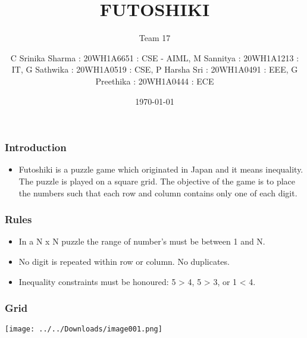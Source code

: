 \documentclass[14pt]{beamer}
\title{FUTOSHIKI}
\subtitle{Team 17}
\date{\today}
\author[14pt]{C Srinika Sharma : 20WH1A6651 : CSE - AIML, M Sannitya : 20WH1A1213 : IT, G Sathwika : 20WH1A0519 : CSE, P Harsha Sri : 20WH1A0491 : EEE, G Preethika : 20WH1A0444 : ECE}
\begin{document}
  
  \begin{frame}
        \titlepage
    \end{frame}
  
  \begin{frame}
	\frametitle{Introduction}
        
	\begin{itemize}
	    \item Futoshiki is a puzzle game which originated in Japan and it means inequality. The puzzle is played on a square grid. The objective of the game is to place the numbers such that each row and column contains only one of each digit.
	\end{itemize}
	
  \end{frame}
   \begin{frame}
	\frametitle{Rules}

	\begin{itemize}
	    \item In a N x N puzzle the range of number's must be between 1 and N.  
	\end{itemize}

	\begin{itemize}
	    \item No digit is repeated within row or column. No duplicates. 
	\end{itemize}

	\begin{itemize}
	    \item Inequality constraints must be honoured: 5 > 4, 5 > 3, or 1 < 4.
	\end{itemize}
  \end{frame}
 \begin{frame}
	\frametitle{Grid}
        
	\texttt{[image: ../../Downloads/image001.png]}
	
  \end{frame}
   
 
\end{document}
